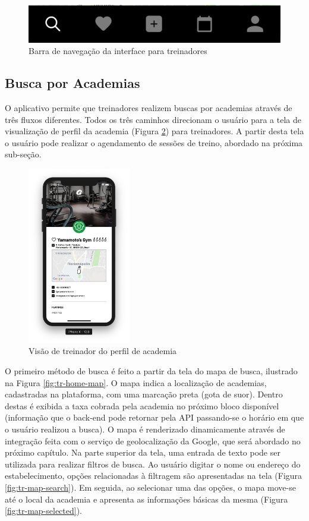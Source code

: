 \begin{figure}[H]
    \centering
    \includegraphics{pfc/figuras/tr-tabbar.png}
    \caption{Barra de navegação da interface para treinadores}
    \label{fig:tr-tabbar}
\end{figure}

\subsection{Busca por Academias}
O aplicativo permite que treinadores realizem buscas por academias através de três fluxos diferentes. Todos os três caminhos direcionam o usuário para a tela de visualização de perfil da academia (Figura \ref{fig:tr-gym-profile-view}) para treinadores. A partir desta tela o usuário pode realizar o agendamento de sessões de treino, abordado na próxima sub-seção.

\begin{figure}[H]
    \centering
    \includegraphics[width=0.4\textwidth]{pfc/figuras/tr-gym-profile-view.png}
    \caption{Visão de treinador do perfil de academia}
    \label{fig:tr-gym-profile-view}
\end{figure}

O primeiro método de busca é feito a partir da tela do mapa de busca, ilustrado na Figura \ref{fig:tr-home-map}. O mapa indica a localização de academias, cadastradas na plataforma, com uma marcação preta (gota de suor). Dentro destas é exibida a taxa cobrada pela academia no próximo bloco disponível (informação que o back-end pode retornar pela API passando-se o horário em que o usuário realizou a busca). O mapa é renderizado dinamicamente através de integração feita com o serviço de geolocalização da Google, que será abordado no próximo capítulo. Na parte superior da tela, uma entrada de texto pode ser utilizada para realizar filtros de busca. Ao usuário digitar o nome ou endereço do estabelecimento, opções relacionadas à filtragem são apresentadas na tela (Figura \ref{fig:tr-map-search}). Em seguida, ao selecionar uma das opções, o mapa move-se até o local da academia e apresenta as informações básicas da mesma (Figura \ref{fig:tr-map-selected}).


